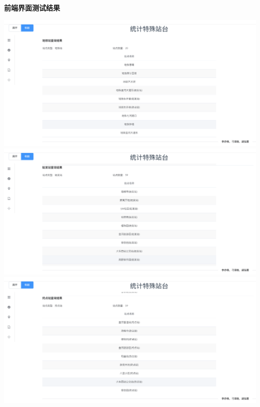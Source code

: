 \documentclass[11pt,a4paper]{article}
\begin{document}
\textbf{前端界面测试结果} \\
\begin{center}
\centering
\includegraphics[scale=0.3]{./assets/demand11_1.png} \\ 
\includegraphics[scale=0.3]{./assets/demand11_2.png} \\ 
\includegraphics[scale=0.3]{./assets/demand11_3.png} 
\end{center}
\end{document}
